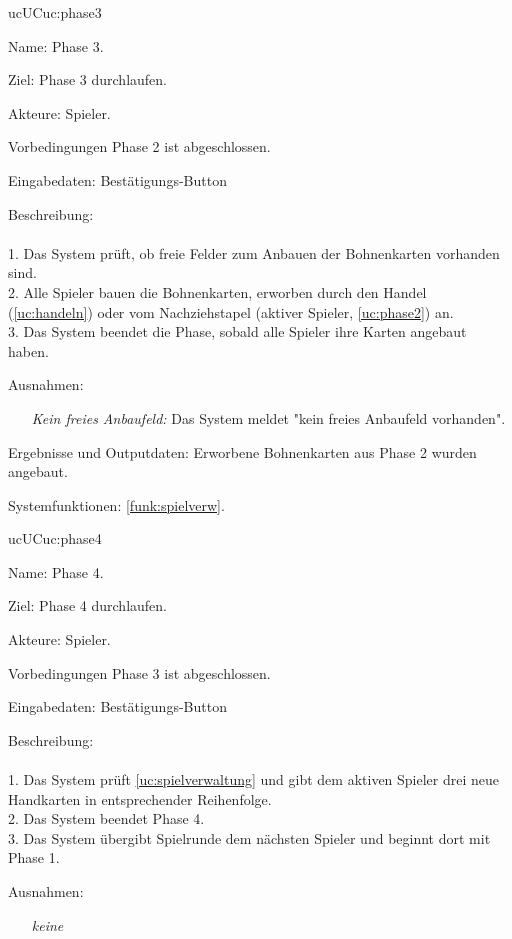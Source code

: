 \begin{description}[leftmargin=5em, style=sameline]
	\begin{lhp}{uc}{UC}{uc:phase3}
		\item [Name:] Phase 3.
		\item [Ziel:] Phase 3 durchlaufen.
		\item [Akteure:] Spieler.
		\item [Vorbedingungen] Phase 2 ist abgeschlossen.
		\item [Eingabedaten:] Bestätigungs-Button
		\item [Beschreibung:] \hfill\\ \hfill\\
			1. Das System prüft, ob freie Felder zum Anbauen der Bohnenkarten vorhanden sind.\\
			2. Alle Spieler bauen die Bohnenkarten, erworben durch den Handel (\ref{uc:handeln}) oder vom Nachziehstapel (aktiver Spieler, \ref{uc:phase2}) an.\\
			3. Das System beendet die Phase, sobald alle Spieler ihre Karten angebaut haben.\\
		\item [Ausnahmen:] \hfill
			\begin{itemize} 
				\item[] \textit{Kein freies Anbaufeld:} Das System meldet "{}kein freies Anbaufeld vorhanden{}"{}.
				
			\end{itemize}
		\item [Ergebnisse und Outputdaten:] Erworbene Bohnenkarten aus Phase 2 wurden angebaut.  
		\item [Systemfunktionen:] \ref{funk:spielverw}.
	\end{lhp}

	\begin{lhp}{uc}{UC}{uc:phase4}
		\item [Name:] Phase 4.
		\item [Ziel:] Phase 4 durchlaufen.
		\item [Akteure:] Spieler.
		\item [Vorbedingungen] Phase 3 ist abgeschlossen.
		\item [Eingabedaten:] Bestätigungs-Button
		\item [Beschreibung:] \hfill\\ \hfill\\
			1. Das System prüft \ref{uc:spielverwaltung} und gibt dem aktiven Spieler drei neue Handkarten in entsprechender Reihenfolge.\\
			2. Das System beendet Phase 4.\\
			3. Das System übergibt Spielrunde dem nächsten Spieler und beginnt dort mit Phase 1.\\
		\item [Ausnahmen:] \hfill
			\begin{itemize} 
				\item[] \textit{keine} 
				

\end{itemize}
\end{lhp}
\end{description}
